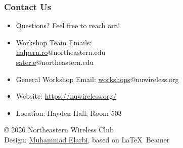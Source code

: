 \documentclass[x11names]{beamer}                            %
\begin{document}
\begin{frame}
    \frametitle{Contact Us}
    \begin{itemize}
        \item Questions? Feel free to reach out! \linebreak \\
        \item Workshop Team Emails: \\
        \href{mailto:halpern.ro@northeastern.edu}{halpern.ro}$@$northeastern.edu \\
		\href{mailto:sater.e@northeastern.edu}{sater.e}$@$northeastern.edu
        \item General Workshop Email: \href{mailto:workshops@nuwireless.org}{workshops}$@$nuwireless.org
        \item Website: \url{https://nuwireless.org/}
        \item Location: Hayden Hall, Room 503
    \end{itemize}
    \vspace{1cm}
    \begin{flushright}
        \footnotesize{© 2026 Northeastern Wireless Club} \\
        \footnotesize{Design: \href{https://melarbi.com}{Muhammad Elarbi}, based on \LaTeX\ Beamer}\\
    \end{flushright}
\end{frame}
\end{document}
